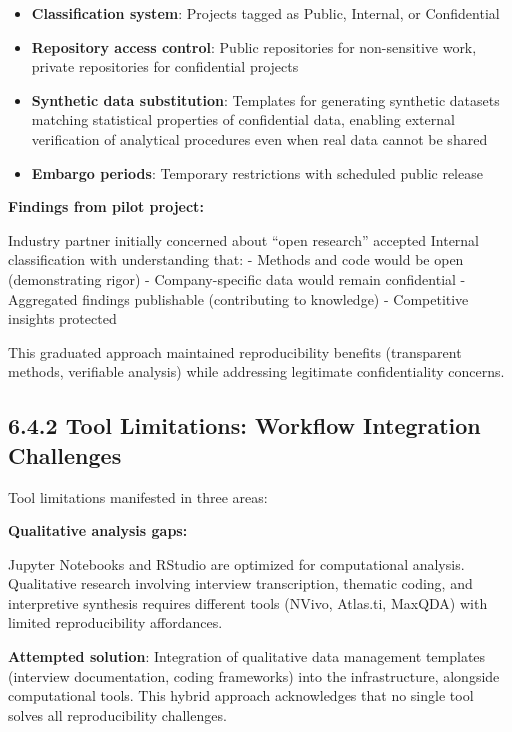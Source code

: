 \documentclass[
  oneside,
  open=any]{scrbook}
\providecommand{\tightlist}{%
  \setlength{\itemsep}{0pt}\setlength{\parskip}{0pt}}\usepackage{longtable,booktabs,array}
\begin{document}
\begin{itemize}
\tightlist
\item
  \textbf{Classification system}: Projects tagged as Public, Internal,
  or Confidential
\item
  \textbf{Repository access control}: Public repositories for
  non-sensitive work, private repositories for confidential projects
\item
  \textbf{Synthetic data substitution}: Templates for generating
  synthetic datasets matching statistical properties of confidential
  data, enabling external verification of analytical procedures even
  when real data cannot be shared
\item
  \textbf{Embargo periods}: Temporary restrictions with scheduled public
  release
\end{itemize}

\textbf{Findings from pilot project:}

Industry partner initially concerned about ``open research'' accepted
Internal classification with understanding that: - Methods and code
would be open (demonstrating rigor) - Company-specific data would remain
confidential - Aggregated findings publishable (contributing to
knowledge) - Competitive insights protected

This graduated approach maintained reproducibility benefits (transparent
methods, verifiable analysis) while addressing legitimate
confidentiality concerns.

\subsection{6.4.2 Tool Limitations: Workflow Integration
Challenges}\label{tool-limitations-workflow-integration-challenges}

Tool limitations manifested in three areas:

\textbf{Qualitative analysis gaps:}

Jupyter Notebooks and RStudio are optimized for computational analysis.
Qualitative research involving interview transcription, thematic coding,
and interpretive synthesis requires different tools (NVivo, Atlas.ti,
MaxQDA) with limited reproducibility affordances.

\textbf{Attempted solution}: Integration of qualitative data management
templates (interview documentation, coding frameworks) into the
infrastructure, alongside computational tools. This hybrid approach
acknowledges that no single tool solves all reproducibility challenges.
\end{document}
